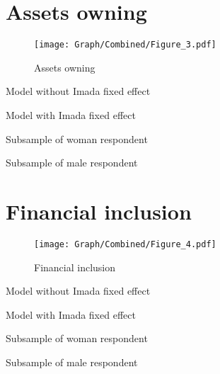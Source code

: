 \documentclass[10pt,a4paper]{article}
\begin{document}
\section{Assets owning}
\begin{table}[H]\centering

\end{table}
\begin{figure}[H]\centering
\texttt{[image: Graph/Combined/Figure\_3.pdf]}
\caption{Assets owning} \label{fig:Fig_3}
\end{figure}
\begin{table}[H]\centering\caption{Model without Imada fixed effect}

\end{table}
\begin{table}[H]\centering\caption{Model with Imada fixed effect}

\end{table}
\begin{table}[H]\centering\caption{Subsample of woman respondent}

\end{table}
\begin{table}[H]\centering\caption{Subsample of male respondent}

\end{table}
\pagebreak
\section{Financial inclusion}
\begin{table}[H]\centering

\end{table}
\begin{figure}[H]\centering
\texttt{[image: Graph/Combined/Figure\_4.pdf]}
\caption{Financial inclusion} \label{fig:Fig_4}
\end{figure}
\begin{table}[H]\centering\caption{Model without Imada fixed effect}

\end{table}
\begin{table}[H]\centering\caption{Model with Imada fixed effect}

\end{table}
\begin{table}[H]\centering\caption{Subsample of woman respondent}

\end{table}
\begin{table}[H]\centering\caption{Subsample of male respondent}

\end{table}
\pagebreak
\end{document}
